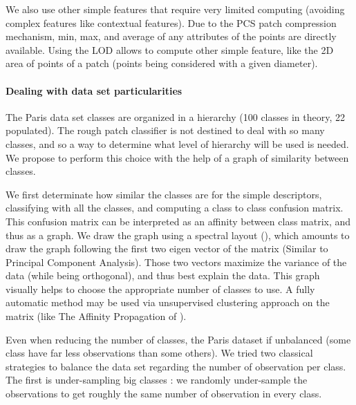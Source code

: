 		\label{lod.method.classification.other_feature}
		We also use other simple features that require very limited computing (avoiding complex features like contextual features). 
		Due to the PCS patch compression mechanism,
		min, max, and average of any attributes of the points are directly available.
		Using the LOD allows to compute other simple feature, like the 2D area of points of a patch (points being considered with a given diameter). 
		
		\paragraph{Dealing with data set particularities}
		The Paris data set classes are organized in a hierarchy (100 classes in theory, 22 populated).
		The rough patch classifier is not destined to deal with so many classes,
		and so a way to determine what level of hierarchy will be used is needed.
		We propose to perform this choice with the help of a graph of similarity between classes.

		\label{lod.method.classification.spectral_layout}
		We first determinate how similar the classes are for the simple descriptors, classifying with all the classes, and computing a class to class confusion matrix.
		This confusion matrix can be interpreted as an affinity between class matrix, and thus as a graph.
		We draw the graph using a spectral layout (\cite{Networkx2014}),
		 which amounts to draw the graph following the first two eigen vector of the matrix (Similar to Principal Component Analysis).
		Those two vectors maximize the variance of the data (while being orthogonal), and thus best explain the data.
		This graph visually helps to choose the appropriate number of classes to use.
		A fully automatic method may be used via unsupervised clustering approach on the matrix 
		(like The Affinity Propagation of \cite{Frey2007}).
		
		Even when reducing the number of classes, the Paris dataset if unbalanced (some class have far less observations than some others).
		We tried two classical strategies to balance the data set regarding the number of observation per class.
		The first is under-sampling big classes : we randomly under-sample the observations to get roughly the same number of observation in every class.
		
